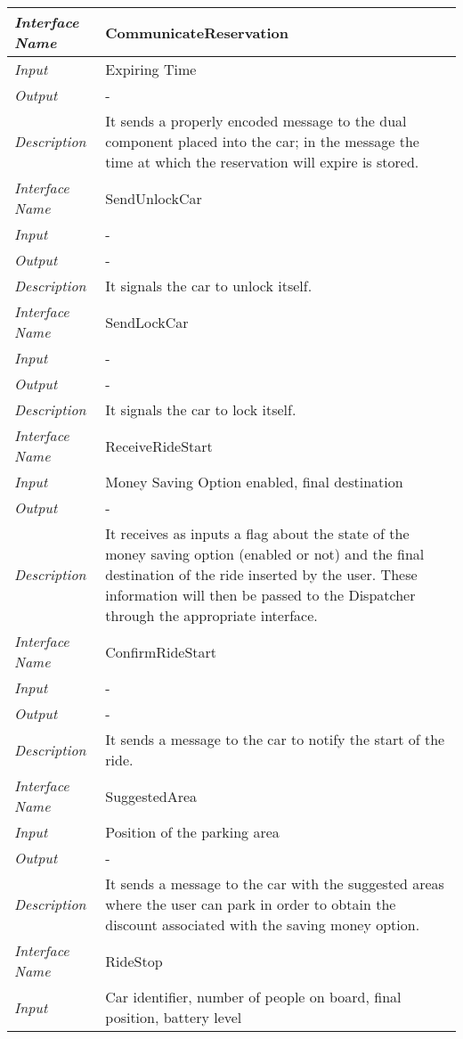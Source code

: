 \begin{longtable}{|>{\em}l|X|}  
	\hline
	Interface Name& CommunicateReservation\\
	\hline
	Input & Expiring Time\\
	\hline
	Output & -\\
	\hline
	Description &It sends a properly encoded message to the dual component placed into the car; in the message the time at which the reservation will expire is stored.\\
	\hline
	\hline
	Interface Name& SendUnlockCar\\
	\hline
	Input & -\\
	\hline
	Output & -\\
	\hline
	Description &It signals the car to unlock itself.\\
	\hline
	\hline
	Interface Name& SendLockCar\\
	\hline
	Input & -\\
	\hline
	Output & -\\
	\hline
	Description &It signals the car to lock itself.\\
	\hline
	\hline
	Interface Name& ReceiveRideStart\\
	\hline
	Input & Money Saving Option enabled, final destination\\
	\hline
	Output & -\\
	\hline
	Description &It receives as inputs a flag about the state of the money saving option (enabled or not) and the final destination of the ride inserted by the user. These information will then be passed to the Dispatcher through the appropriate interface.\\
	\hline
	\hline
	Interface Name& ConfirmRideStart\\
	\hline
	Input & -\\
	\hline
	Output & -\\
	\hline
	Description &It sends a message to the car to notify the start of the ride.\\
	\hline
	\hline
	Interface Name& SuggestedArea\\
	\hline
	Input & Position of the parking area\\
	\hline
	Output & -\\
	\hline
	Description &It sends a message to the car with the suggested areas where the user can park in order to obtain the discount associated with the saving money option.\\
	\hline
	\hline
	Interface Name& RideStop\\
	\hline
	Input & Car identifier, number of people on board, final position, battery level\\

\end{longtable}
